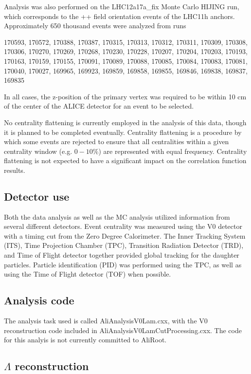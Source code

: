 Analysis was also performed on the LHC12a17a\_fix Monte Carlo HIJING run, which corresponds to the ++ field orientation events of the LHC11h anchors.  Approximately 650 thousand events were analyzed from runs

170593, 170572, 170388, 170387, 170315, 170313, 170312, 170311, 170309, 170308, 170306, 170270, 170269, 170268, 170230, 170228, 170207, 170204, 170203, 170193, 170163, 170159, 170155, 170091, 170089, 170088, 170085, 170084, 170083, 170081, 170040, 170027, 169965, 169923, 169859, 169858, 169855, 169846, 169838, 169837, 169835

In all cases, the z-position of the primary vertex was required to be within 10 cm of the center of the ALICE detector for an event to be selected.  

No centrality flattening is currently employed in the analysis of this data, though it is planned to be completed eventually.  Centrality flattening is a procedure by which some events are rejected to ensure that all centralities within a given centrality window (e.g. $0-10\%$) are represented with equal frequency.  Centrality flattening is not expected to have a significant impact on the correlation function results.

\subsection{Detector use}
Both the data analysis as well as the MC analysis utilized information from several different detectors.  Event centrality was measured using the V0 detector with a timing cut from the Zero Degree Calorimeter.  The Inner Tracking System (ITS), Time Projection Chamber (TPC), Transition Radiation Detector (TRD), and Time of Flight detector together provided global tracking for the daughter particles.  Particle identification (PID) was performed using the TPC, as well as using the Time of Flight detector (TOF) when possible.

\subsection{Analysis code}
The analysis task used is called AliAnalysisV0Lam.cxx, with the V0 reconstruction code included in AliAnalysisV0LamCutProcessing.cxx.  The code for this analyis is not currently committed to AliRoot.

\subsection{$\Lambda$ reconstruction}
\label{sec:Recon}

